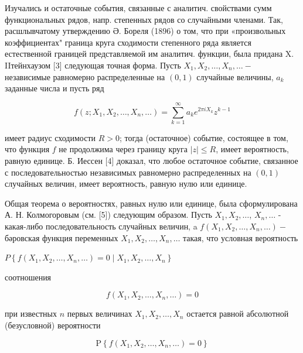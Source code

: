 \documentclass[10pt]{article}
\begin{document}
Изучались и остаточные события, связанные с аналитич. свойствами сумм функциональных рядов, напр. степенных рядов со случайными членами. Так, расшлывчатому утверждению Ә. Бореля (1896) о том, что при «произвольных коэффициентах" граница круга сходимости степенного ряда является естественной границей представляемой им аналитич. функции, была придана X. IIтейнхаузом [3] следующая точная форма. Пусть $X_{1}, X_{2}, \ldots, X_{n}, \ldots-$ независимые равномерно распределенные на $(0,1)$ случайные величины, $a_{k}$ заданные числа и пусть ряд



\[

f\left(z ; X_{1}, X_{2}, \ldots, X_{n}, \ldots\right)=\sum_{k=1}^{\infty} a_{k} e^{2 \pi i X_{k}} z^{k-1}

\]



имеет радиус сходимости $R>0$; тогда (остаточное) событие, состоящее в том, что функция $f$ не продолжима через границу круга $|z| \leqslant R$, имеет вероятность, равную единице. Б. Иессен [4] доказал, что любое остаточное событие, связанное с последовательностью независимых равномерно распределенных на $(0,1)$ случайных величин, имеет вероятность, равную нулю или единице.



Общая теорема о вероятностях, равных нулю или единице, была сформулирована А. Н. Колмогоровым (см. [5]) следующим образом. Пусть $X_{1}, X_{2}, \ldots$, $X_{n}, \ldots$ - какая-либо последовательность случайных величин, a $f\left(X_{1}, X_{2}, \ldots, X_{n}, \ldots\right)-$ бәровская функция переменных $X_{1}, X_{2}, \ldots, X_{n}, \ldots$ такая, что условная вероятность



$P\left\{f\left(X_{1}, X_{2}, \ldots, X_{n}, \ldots\right)=0 \mid X_{1}, X_{2}, \ldots, X_{n}\right\}$



соотношения



\[

f\left(X_{1}, X_{2}, \ldots, X_{n}, \ldots\right)=0

\]



при известных $n$ первых величинах $X_{1}, X_{2}, \ldots, X_{n}$ остается равной абсолютной (безусловной) вероятности



\[

\mathrm{P}\left\{f\left(X_{1}, X_{2}, \ldots, X_{n}, \ldots\right)=0\right\}

\]
\end{document}
